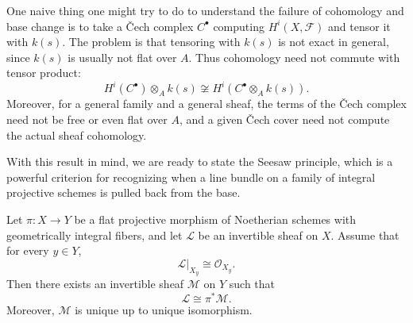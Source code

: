 \documentclass[12pt]{article}
\begin{document}
\begin{remark}
    One naive thing one might try to do to understand the failure of cohomology and base change is to take a \v{C}ech complex \(C^\bullet\) computing \(H^i(X,\mathcal F)\) and tensor it with \(k(s)\). The problem is that tensoring with \(k(s)\) is not exact in general, since \(k(s)\) is usually not flat over \(A\). Thus cohomology need not commute with tensor product:
    \[
        H^i(C^\bullet)\otimes_A k(s) \not\cong H^i(C^\bullet\otimes_A k(s)).
    \]
    Moreover, for a general family and a general sheaf, the terms of the \v{C}ech complex need not be free or even flat over \(A\), and a given \v{C}ech cover need not compute the actual sheaf cohomology.
\end{remark}

With this result in mind, we are ready to state the Seesaw principle, which is a powerful criterion for recognizing when a line bundle on a family of integral projective schemes is pulled back from the base.

\begin{theorem}\label{thm:seesaw-pullback}
    Let \(\pi:X\to Y\) be a flat projective morphism of Noetherian schemes with
    geometrically integral fibers, and let \(\mathcal L\) be an invertible sheaf on \(X\).
    Assume that for every \(y\in Y\),
    \[
        \mathcal L|_{X_y}\cong \mathcal O_{X_y}.
    \]
    Then there exists an invertible sheaf \(\mathcal M\) on \(Y\) such that
    \[
        \mathcal L \cong \pi^*\mathcal M.
    \]
    Moreover, \(\mathcal M\) is unique up to unique isomorphism.
\end{theorem}
\end{document}
